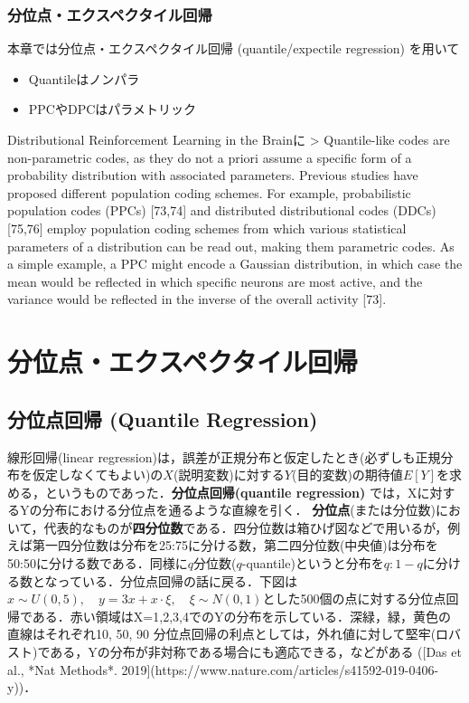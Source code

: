 \subsubsection{分位点・エクスペクタイル回帰}
本章では分位点・エクスペクタイル回帰 (quantile/expectile regression) を用いて
\begin{itemize}
\item Quantileはノンパラ
\item PPCやDPCはパラメトリック
\end{itemize}
Distributional Reinforcement Learning in the Brainに
> Quantile-like codes are non-parametric codes, as they do not a priori assume a specific form of a probability distribution with associated parameters. Previous studies have proposed different population coding schemes. For example, probabilistic population codes (PPCs) [73,74] and distributed distributional codes (DDCs) [75,76] employ population coding schemes from which various statistical parameters of a distribution can be read out, making them parametric codes. As a simple example, a PPC might encode a Gaussian distribution, in which case the mean would be reflected in which specific neurons are most active, and the variance would be reflected in the inverse of the overall activity [73].
\section{分位点・エクスペクタイル回帰}
\subsection{分位点回帰 (Quantile Regression)}
線形回帰(linear regression)は，誤差が正規分布と仮定したとき(必ずしも正規分布を仮定しなくてもよい)の$X$(説明変数)に対する$Y$(目的変数)の期待値$E[Y]$を求める，というものであった．\textbf{分位点回帰(quantile regression)} では，Xに対するYの分布における分位点を通るような直線を引く．
\textbf{分位点}(または分位数)において，代表的なものが\textbf{四分位数}である．四分位数は箱ひげ図などで用いるが，例えば第一四分位数は分布を25:75に分ける数，第二四分位数(中央値)は分布を50:50に分ける数である．同様に$q$分位数($q$-quantile)というと分布を$q:1-q$に分ける数となっている．分位点回帰の話に戻る．下図は$x\sim U(0, 5),\quad y=3x+x\cdot \xi,\quad \xi\sim N(0,1)$とした500個の点に対する分位点回帰である．赤い領域はX=1,2,3,4でのYの分布を示している．深緑，緑，黄色の直線はそれぞれ10, 50, 90%
分位点回帰の利点としては，外れ値に対して堅牢(ロバスト)である，Yの分布が非対称である場合にも適応できる，などがある ([Das et al., *Nat Methods*. 2019](https://www.nature.com/articles/s41592-019-0406-y))．
